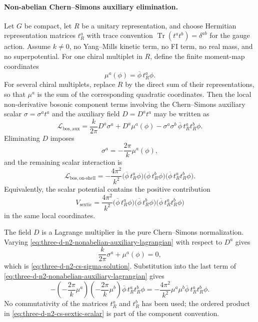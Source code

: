 \paragraph{Non-abelian Chern--Simons auxiliary elimination.}
Let \(G\) be compact, let \(R\) be a unitary representation, and choose
Hermitian representation matrices \(t_R^a\) with trace convention
\(\operatorname{Tr}(t^at^b)=\delta^{ab}\) for the gauge action.  Assume
\(k\neq 0\), no Yang--Mills kinetic term, no FI term, no real mass, and no
superpotential.  For one chiral multiplet in \(R\), define the finite
moment-map coordinates
\[
  \mu^a(\phi)=\overline\phi\,t_R^a\phi .
\]
For several chiral multiplets, replace \(R\) by the direct sum of their
representations, so that \(\mu^a\) is the sum of the corresponding quadratic
coordinates.
Then the local non-derivative bosonic component terms involving the
Chern--Simons auxiliary scalar \(\sigma=\sigma^a t^a\) and the auxiliary
field \(D=D^a t^a\) may be written as
\begin{equation}
  \mathcal L_{\mathrm{bos,aux}}
  =
  \frac{k}{2\pi}D^a\sigma^a
  +
  D^a\mu^a(\phi)
  -
  \sigma^a\sigma^b\,
  \overline\phi\, t_R^a t_R^b\phi .
  \label{eq:three-d-n2-nonabelian-auxiliary-lagrangian}
\end{equation}
Eliminating \(D\) imposes
\begin{equation}
  \sigma^a=-\frac{2\pi}{k}\mu^a(\phi),
  \label{eq:three-d-n2-cs-sigma-solution}
\end{equation}
and the remaining scalar interaction is
\begin{equation}
  \mathcal L_{\mathrm{bos,on\text{-}shell}}
  =
  -\frac{4\pi^2}{k^2}
  \bigl(\overline\phi\,t_R^a\phi\bigr)
  \bigl(\overline\phi\,t_R^b\phi\bigr)
  \bigl(\overline\phi\,t_R^a t_R^b\phi\bigr).
  \label{eq:three-d-n2-cs-sextic-scalar}
\end{equation}
Equivalently, the scalar potential contains the positive contribution
\[
  V_{\mathrm{sextic}}
  =
  \frac{4\pi^2}{k^2}
  \bigl(\overline\phi\,t_R^a\phi\bigr)
  \bigl(\overline\phi\,t_R^b\phi\bigr)
  \bigl(\overline\phi\,t_R^a t_R^b\phi\bigr)
\]
in the same local coordinates.

The field \(D\) is a Lagrange multiplier in the pure Chern--Simons
normalization.  Varying
\eqref{eq:three-d-n2-nonabelian-auxiliary-lagrangian} with respect to
\(D^a\) gives
\[
  \frac{k}{2\pi}\sigma^a+\mu^a(\phi)=0,
\]
which is \eqref{eq:three-d-n2-cs-sigma-solution}.  Substitution into the last
term of \eqref{eq:three-d-n2-nonabelian-auxiliary-lagrangian} gives
\[
  -\left(-\frac{2\pi}{k}\mu^a\right)
   \left(-\frac{2\pi}{k}\mu^b\right)
   \overline\phi\,t_R^at_R^b\phi
  =
  -\frac{4\pi^2}{k^2}
   \mu^a\mu^b\overline\phi\,t_R^at_R^b\phi .
\]
No commutativity of the matrices \(t_R^a\) and \(t_R^b\) has been used; the
ordered product in \eqref{eq:three-d-n2-cs-sextic-scalar} is part of the
component convention.

